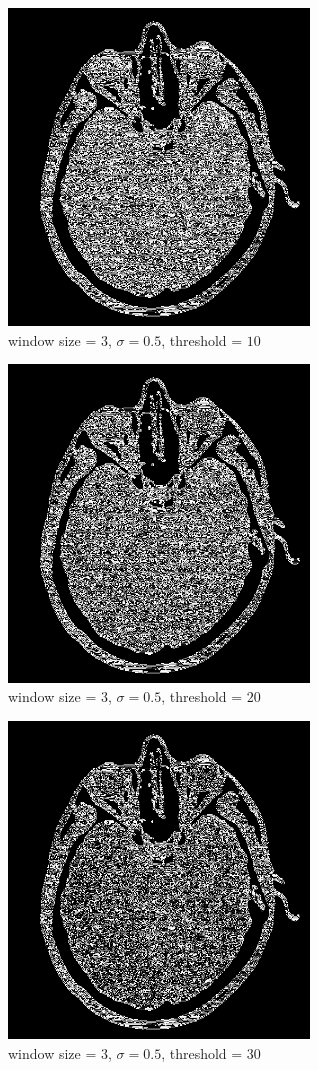\documentclass[conference]{IEEEtran}
\begin{document}
\begin{figure}[H]
\centerline{\includegraphics[width=8cm]{headCT10.png}}
\caption{window size = $3$, $\sigma=0.5$,  threshold = $10$}
\label{headCT10}
\end{figure}

\begin{figure}[H]
\centerline{\includegraphics[width=8cm]{headCT11.png}}
\caption{window size = $3$, $\sigma=0.5$,  threshold = $20$}
\label{headCT11}
\end{figure}

\begin{figure}[H]
\centerline{\includegraphics[width=8cm]{headCT12.png}}
\caption{window size = $3$, $\sigma=0.5$,  threshold = $30$}
\label{headCT12}
\end{figure}
\end{document}
